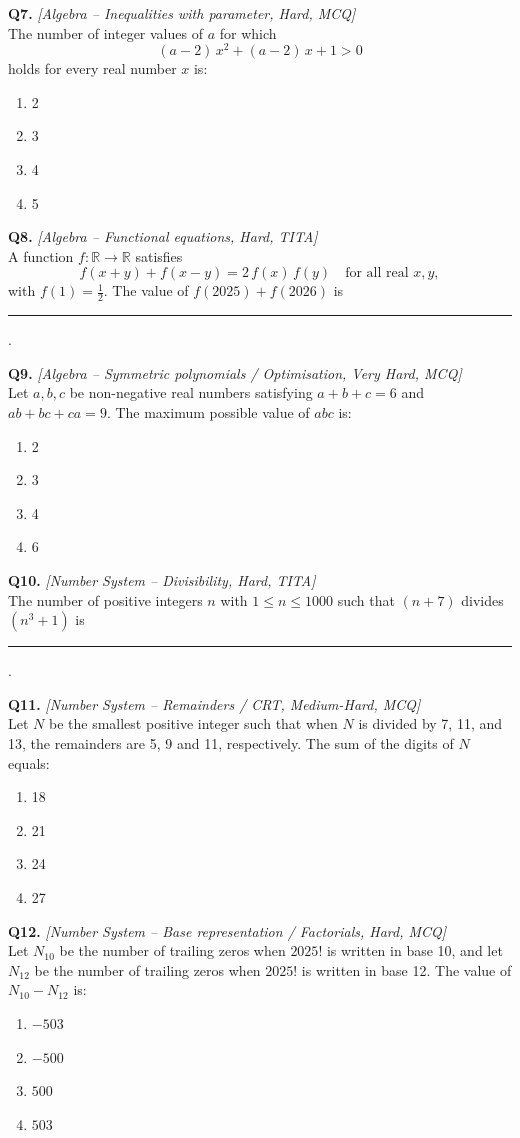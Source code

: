 \documentclass[11pt,a4paper]{article}
\begin{document}
\textbf{Q7.} \textit{[Algebra -- Inequalities with parameter, Hard, MCQ]}\\
The number of integer values of $a$ for which
\[
(a-2)\,x^{2} + (a-2)\,x + 1 > 0
\]
holds for every real number $x$ is:
\begin{enumerate}[label=(\Alph*)]
  \item 2
  \item 3
  \item 4
  \item 5
\end{enumerate}

\textbf{Q8.} \textit{[Algebra -- Functional equations, Hard, TITA]}\\
A function $f:\mathbb{R} \to \mathbb{R}$ satisfies
\[
f(x+y) + f(x-y) = 2\,f(x)\,f(y) \quad \text{for all real } x, y,
\]
with $f(1) = \tfrac{1}{2}$. The value of $f(2025) + f(2026)$ is \rule{2cm}{0.4pt}.

\textbf{Q9.} \textit{[Algebra -- Symmetric polynomials / Optimisation, Very Hard, MCQ]}\\
Let $a, b, c$ be non-negative real numbers satisfying $a + b + c = 6$ and $ab + bc + ca = 9$. The maximum possible value of $abc$ is:
\begin{enumerate}[label=(\Alph*)]
  \item 2
  \item 3
  \item 4
  \item 6
\end{enumerate}

\textbf{Q10.} \textit{[Number System -- Divisibility, Hard, TITA]}\\
The number of positive integers $n$ with $1 \le n \le 1000$ such that $(n+7)$ divides $(n^{3} + 1)$ is \rule{2cm}{0.4pt}.

\textbf{Q11.} \textit{[Number System -- Remainders / CRT, Medium-Hard, MCQ]}\\
Let $N$ be the smallest positive integer such that when $N$ is divided by 7, 11, and 13, the remainders are 5, 9 and 11, respectively. The sum of the digits of $N$ equals:
\begin{enumerate}[label=(\Alph*)]
  \item 18
  \item 21
  \item 24
  \item 27
\end{enumerate}

\textbf{Q12.} \textit{[Number System -- Base representation / Factorials, Hard, MCQ]}\\
Let $N_{10}$ be the number of trailing zeros when $2025!$ is written in base 10, and let $N_{12}$ be the number of trailing zeros when $2025!$ is written in base 12. The value of $N_{10} - N_{12}$ is:
\begin{enumerate}[label=(\Alph*)]
  \item $-503$
  \item $-500$
  \item $500$
  \item $503$
\end{enumerate}
\end{document}
